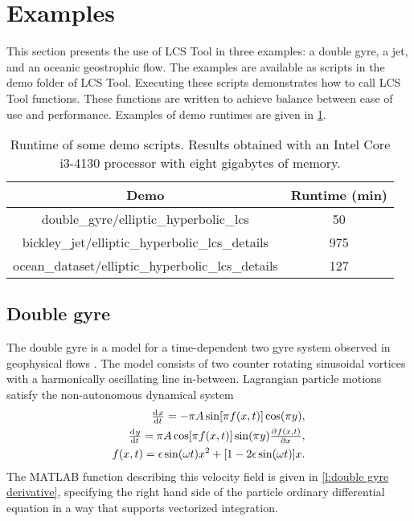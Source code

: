 \documentclass{article}
\begin{document}
\section{Examples}

This section presents the use of LCS Tool in three examples: a double gyre, a jet, and an oceanic geostrophic flow.
The examples are available as scripts in the demo folder of LCS Tool.
Executing these scripts demonstrates how to call LCS Tool functions.
These functions are written to achieve balance between ease of use and performance.
Examples of demo runtimes are given in \cref{t:demo runtimes}.

\begin{table}
\begin{center}
\begin{tabular}{|c|c|}
\hline
Demo & Runtime (min)\tabularnewline
\hline \hline
double\_gyre/elliptic\_hyperbolic\_lcs & 50\tabularnewline
\hline
bickley\_jet/elliptic\_hyperbolic\_lcs\_details & 975\tabularnewline
\hline
ocean\_dataset/elliptic\_hyperbolic\_lcs\_details & 127\tabularnewline
\hline
\end{tabular}
\end{center}
\caption{
Runtime of some demo scripts.
Results obtained with an Intel Core i3-4130 processor with eight gigabytes of memory.
}
\label{t:demo runtimes}
\end{table}

\subsection{Double gyre}
\label{s:double gyre}

The double gyre is a model for a time-dependent two gyre system observed in geophysical flows \parencite{shadden05:_defin_lagran_lyapun}. The model consists of two counter rotating sinusoidal vortices with a harmonically oscillating line in-between. Lagrangian particle motions satisfy the non-autonomous dynamical system
\begin{equation}
\begin{split}
\od{x}{t} = -\pi A \sin[\pi f(x,t)] \cos(\pi y),\\
\od{y}{t} = \pi A \cos[\pi f(x,t)] \sin(\pi y) \pd{f(x,t)}{x},\\
f(x,t) = \epsilon \sin(\omega t) x^2 + [1 - 2 \epsilon \sin(\omega t)] x.
\end{split}
\label{eq:double gyre derivative equations}
\end{equation}
The MATLAB function describing this velocity field is given in \cref{l:double gyre derivative}, specifying the right hand side of the particle ordinary differential equation in a way that supports vectorized integration.
\end{document}

